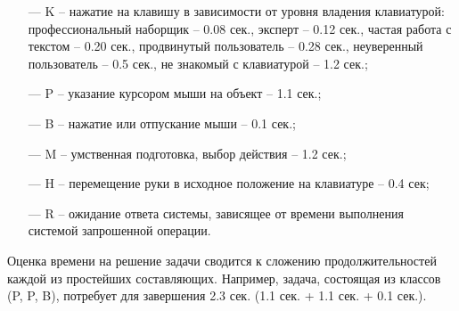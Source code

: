 \begin{itemize}
	\item[---] K – нажатие на клавишу в зависимости от уровня владения клавиатурой: профессиональный	наборщик – 0.08 сек., эксперт – 0.12 сек., частая работа с текстом – 0.20 сек., продвинутый пользователь – 0.28 сек., неуверенный пользователь – 0.5 сек., не знакомый с клавиатурой – 1.2 сек.;
	\item[---] P – указание курсором мыши на объект – 1.1 сек.;
	\item[---] B – нажатие или отпускание мыши – 0.1 сек.;
	\item[---] M – умственная подготовка, выбор действия – 1.2 сек.;
	\item[---] H – перемещение руки в исходное положение на клавиатуре – 0.4 сек;
	\item[---] R – ожидание ответа системы, зависящее от	времени выполнения системой запрошенной операции.
\end{itemize}

Оценка времени на решение задачи сводится к сложению продолжительностей каждой из простейших составляющих. Например, задача, состоящая из классов (P, P, B), потребует для завершения 2.3 сек. (1.1 сек. + 1.1 сек. + 0.1 сек.).



